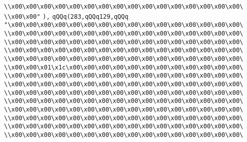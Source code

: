\verb|\\x00\x00\x00\x00\x00\x00\x00\x00\x00\x00\x00\x00\x00\x00\x00\x00\|\newline
\verb|\\x00\x00"|\newline
\verb|),|\newline
\verb|qQQq(283,qQQq129,qQQq|\newline
\verb|"\x00\x00\x00\x00\x00\x00\x00\x00\x00\x00\x00\x00\x00\x00\x00\x00\|\newline
\verb|\\x00\x00\x00\x00\x00\x00\x00\x00\x00\x00\x00\x00\x00\x00\x00\x00\|\newline
\verb|\\x00\x00\x00\x00\x00\x00\x00\x00\x00\x00\x00\x00\x00\x00\x00\x00\|\newline
\verb|\\x00\x00\x00\x00\x00\x00\x00\x00\x00\x00\x00\x00\x00\x00\x00\x00\|\newline
\verb|\\x00\x00\x00\x00\x00\x00\x00\x00\x00\x00\x00\x00\x00\x00\x00\x00\|\newline
\verb|\\x00\x00\x01\x1c\x00\x00\x00\x00\x00\x00\x00\x00\x00\x00\x00\x00\|\newline
\verb|\\x00\x00\x00\x00\x00\x00\x00\x00\x00\x00\x00\x00\x00\x00\x00\x00\|\newline
\verb|\\x00\x00\x00\x00\x00\x00\x00\x00\x00\x00\x00\x00\x00\x00\x00\x00\|\newline
\verb|\\x00\x00\x00\x00\x00\x00\x00\x00\x00\x00\x00\x00\x00\x00\x00\x00\|\newline
\verb|\\x00\x00\x00\x00\x00\x00\x00\x00\x00\x00\x00\x00\x00\x00\x00\x00\|\newline
\verb|\\x00\x00\x00\x00\x00\x00\x00\x00\x00\x00\x00\x00\x00\x00\x00\x00\|\newline
\verb|\\x00\x00\x00\x00\x00\x00\x00\x00\x00\x00\x00\x00\x00\x00\x00\x00\|\newline
\verb|\\x00\x00\x00\x00\x00\x00\x00\x00\x00\x00\x00\x00\x00\x00\x00\x00\|\newline
\verb|\\x00\x00\x00\x00\x00\x00\x00\x00\x00\x00\x00\x00\x00\x00\x00\x00\|\newline
